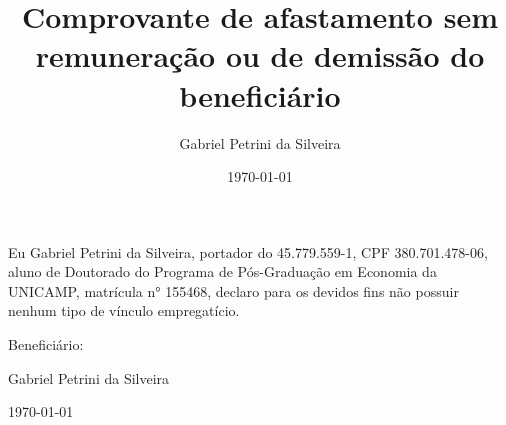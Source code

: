 \documentclass[11pt,a4paper]{article}
\author{Gabriel Petrini da Silveira}
\title{Comprovante de afastamento sem remuneração ou de demissão do beneficiário}
\date{\today}
\def\myauthor{Gabriel Petrini da Silveira} %
\def\mydate{\today} %
\begin{document}
	\maketitle
	
	
	
	
	Eu Gabriel Petrini da Silveira, portador do 45.779.559-1, CPF 380.701.478-06, aluno de Doutorado do Programa de Pós-Graduação em Economia da UNICAMP, matrícula n° 155468, declaro para os devidos fins não possuir nenhum tipo de vínculo empregatício.
	
	
\vspace{5cm}	
Beneficiário: \hrulefill
\begin{center}

\hspace*{0mm}\phantom{Nome: }\myauthor

\hspace*{0mm}\phantom{Data: }\mydate

\end{center}	
\end{document}
